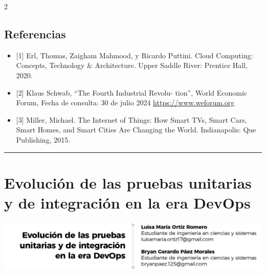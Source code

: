 \documentclass[12pt,spanish,Letterpaper,openany]{book}
\newcommand{\HRule}{\begin{center}\rule{0.5\linewidth}{0.2mm}\end{center}}
\begin{document}
\begin {multicols}{2}
\hypertarget{referencias-4}{%
\section{Referencias}\label{referencias-4}}

\begin{itemize}
\item
  {[}1{]} Erl, Thomas, Zaigham Mahmood, y Ricardo Puttini. Cloud Computing: Concepts, Technology \& Architecture. Upper Saddle River: Prentice Hall, 2020.
\item
  {[}2{]} Klaus Schwab, ``The Fourth Industrial Revolu-
  tion'', World Economic Forum, Fecha de consulta: 30 de julio 2024
  \href{https://www.weforum.org/about/the-fourth-industrial-revolution-by-klaus-schwab/}{https://www.weforum.org}
\item
  {[}3{]} Miller, Michael. The Internet of Things: How Smart TVs, Smart Cars, Smart Homes, and Smart Cities Are Changing the World. Indianapolis: Que Publishing, 2015.
\end{itemize}

\end {multicols}

\medskip

\HRule

\medskip

\hypertarget{pareja08}{%
\chapter{Evolución de las pruebas unitarias y de integración en la era DevOps}\label{pareja08}}

\begin{center}\includegraphics[width=1\linewidth]{autores/pareja08_01} \end{center}
\end{document}
